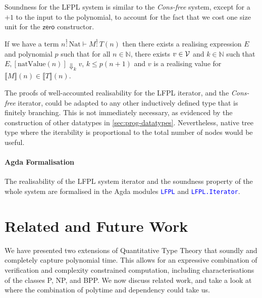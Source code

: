 \documentclass[acmsmall,screen]{acmart}
\newcommand{\tyNat}{\mathrm{Nat}}
\newcommand{\conZero}{\mathsf{zero}}
\newcommand{\ConsFree}{\emph{Cons-free}}
\newcommand{\AgdaModule}[1]{\textcolor{blue}{\tt #1}}
\begin{document}
Soundness for the LFPL system is similar to the \ConsFree{}
system, except for a $+1$ to the input to the polynomial, to account
for the fact that we cost one size unit for the $\conZero$
constructor.
\begin{theorem}
  \label{thm:lfpl-soundness}
  If we have a term $n \stackrel1: \tyNat \vdash M \stackrel1: T(n)$ then there
  exists a realising expression $E$ and polynomial $p$ such that for
  all $n \in \mathbb{N}$, there exists $v \in \mathcal{V}$ and
  $k \in \mathbb{N}$ such that
  $E, [\mathrm{natValue}(n)] \Downarrow_k v$, $k \leq p(n+1)$ and $v$
  is a realising value for
  $\llbracket M \rrbracket(n) \in \llbracket T \rrbracket(n)$.
\end{theorem}

The proofs of well-accounted realisability for the LFPL iterator, and
the \ConsFree{} iterator, could be adapted to any other
inductively defined type that is finitely branching. This is not
immediately necessary, as evidenced by the construction of other
datatypes in \autoref{sec:prog-datatypes}. Nevertheless, native tree
type where the iterability is proportional to the total number of
nodes would be useful.

\paragraph{Agda Formalisation} The realisability of the LFPL system
iterator and the soundness property of the whole system are formalised
in the Agda modules \AgdaModule{LFPL} and \AgdaModule{LFPL.Iterator}.

\section{Related and Future Work}
\label{sec:conclusion}

We have presented two extensions of Quantitative Type Theory that
soundly and completely capture polynomial time. This allows for an
expressive combination of verification and complexity constrained
computation, including characterisations of the classes P, NP, and
BPP. We now discuss related work, and take a look at where the
combination of polytime and dependency could take us.
\end{document}
